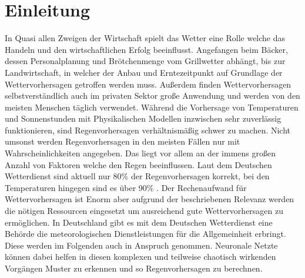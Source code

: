 \section{Einleitung}
In Quasi allen Zweigen der Wirtschaft spielt das Wetter eine Rolle welche das Handeln und den wirtschaftlichen Erfolg beeinflusst.
Angefangen beim Bäcker, dessen Personalplanung und Brötchenmenge vom Grillwetter abhängt, 
bis zur Landwirtschaft, in welcher der Anbau und Erntezeitpunkt auf Grundlage der Wettervorhersagen getroffen werden muss. 
Außerdem finden Wettervorhersagen selbstverständlich auch im privaten Sektor große Anwendung und werden von den meisten Menschen täglich verwendet. 
Während die Vorhersage von Temperaturen und Sonnenstunden mit Physikalischen Modellen inzwischen sehr zuverlässig funktionieren, 
sind Regenvorhersagen verhältnismäßig schwer zu machen. Nicht umsonst werden Regenvorhersagen in den meisten Fällen nur mit Wahrscheinlichkeiten angegeben. 
Das liegt vor allem an der immens großen Anzahl von Faktoren welche den Regen beeinflussen. 
Laut dem Deutschen Wetterdienst sind aktuell nur 80\% der Regenvorhersagen korrekt, bei den Temperaturen hingegen sind es über 90\% \cite{SpiegelWetter}. 
Der Rechenaufwand für Wettervorhersagen ist Enorm aber aufgrund der beschriebenen Relevanz werden die nötigen Ressourcen eingesetzt um ausreichend gute Wettervorhersagen zu ermöglichen.
In Deutschland gibt es mit dem Deutschen Wetterdienst eine Behörde die meteorologischen Dienstleistungen für die Allgemeinheit erbringt.
Diese werden im Folgenden auch in Anspruch genommen.      
\noindent Neuronale Netzte können dabei helfen in diesen komplexen und teilweise chaotisch wirkenden Vorgängen Muster zu erkennen und so Regenvorhersagen zu berechnen. 
